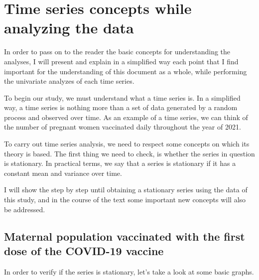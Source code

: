 \documentclass[
]{article}
\newenvironment{Shaded}{\begin{snugshade}}{\end{snugshade}}
\newcommand{\AttributeTok}[1]{\textcolor[rgb]{0.13,0.29,0.53}{#1}}
\newcommand{\FunctionTok}[1]{\textcolor[rgb]{0.13,0.29,0.53}{\textbf{#1}}}
\newcommand{\NormalTok}[1]{#1}
\newcommand{\SpecialCharTok}[1]{\textcolor[rgb]{0.81,0.36,0.00}{\textbf{#1}}}
\newcommand{\StringTok}[1]{\textcolor[rgb]{0.31,0.60,0.02}{#1}}
\renewenvironment{Shaded}{\begin{mdframed}[ backgroundcolor=shadecolor, linecolor = shadecolor, leftmargin=\dimexpr\leftmargin-2pt\relax, innerleftmargin=1.6pt, innertopmargin=5pt, skipabove=10pt,skipbelow=3pt ]}{\end{mdframed}}
\begin{document}
\section{Time series concepts while analyzing the data}

In order to pass on to the reader the basic concepts for understanding
the analyses, I will present and explain in a simplified way each point
that I find important for the understanding of this document as a whole,
while performing the univariate analyzes of each time series.

To begin our study, we must understand what a time series is. In a
simplified way, a time series is nothing more than a set of data
generated by a random process and observed over time. As an example of a
time series, we can think of the number of pregnant women vaccinated
daily throughout the year of 2021.

To carry out time series analysis, we need to respect some concepts on
which its theory is based. The first thing we need to check, is whether
the series in question is stationary. In practical terms, we say that a
series is stationary if it has a constant mean and variance over time.

I will show the step by step until obtaining a stationary series using
the data of this study, and in the course of the text some important new
concepts will also be addressed.

\subsection{Maternal population vaccinated with the first dose of the
COVID-19
vaccine}\label{maternal-population-vaccinated-with-the-first-dose-of-the-covid-19-vaccine}

In order to verify if the series is stationary, let's take a look at
some basic graphs.

\begin{Shaded}
\end{Shaded}
\end{document}

